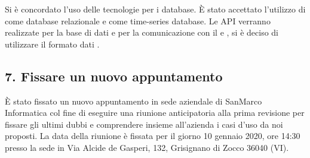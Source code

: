 	Si è concordato l'uso delle tecnologie per i database. È stato accettato l'utilizzo di  come database relazionale e  come time-series database. Le API verranno realizzate per la base di dati e per la comunicazione con il  e , si è deciso di utilizzare il formato dati .

	\subsection*{7. Fissare un nuovo appuntamento}

	È stato fissato un nuovo appuntamento in sede aziendale di SanMarco Informatica col fine di eseguire una riunione anticipatoria alla prima revisione per fissare gli ultimi dubbi e comprendere insieme all'azienda i casi d'uso da noi proposti. La data della riunione è fissata per il giorno 10 gennaio 2020, ore 14:30 presso la sede in Via Alcide de Gasperi, 132, Grisignano di Zocco 36040 (VI).